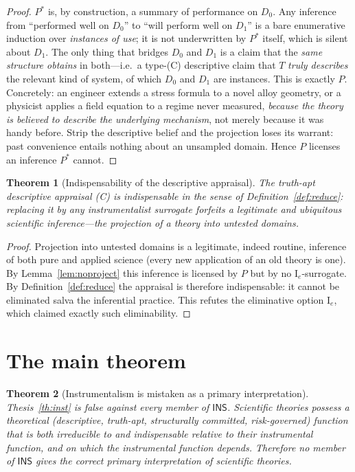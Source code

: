 \documentclass{amsart}
\theoremstyle{definition}
\theoremstyle{plain}
\newtheorem{theorem}{Theorem}
\begin{document}
\begin{proof}
$P^{*}$ is, by construction, a summary of performance on $D_0$. Any inference
from ``performed well on $D_0$'' to ``will perform well on $D_1$'' is a bare
enumerative induction over \emph{instances of use}; it is not underwritten by
$P^{*}$ itself, which is silent about $D_1$. The only thing that bridges $D_0$
and $D_1$ is a claim that the \emph{same structure obtains} in both---i.e.\ a
type-(C) descriptive claim that $T$ \emph{truly describes} the relevant kind of
system, of which $D_0$ and $D_1$ are instances. This is exactly $P$. Concretely:
an engineer extends a stress formula to a novel alloy geometry, or a physicist
applies a field equation to a regime never measured, \emph{because the theory is
believed to describe the underlying mechanism}, not merely because it was handy
before. Strip the descriptive belief and the projection loses its warrant: past
convenience entails nothing about an unsampled domain. Hence $P$ licenses an
inference $P^{*}$ cannot.
\end{proof}

\begin{theorem}[Indispensability of the descriptive appraisal]\label{thm:indispensable}
The truth-apt descriptive appraisal (C) is \emph{indispensable} in the sense of
Definition~\ref{def:reduce}: replacing it by any instrumentalist surrogate
forfeits a legitimate and ubiquitous scientific inference---the projection of a
theory into untested domains.
\end{theorem}

\begin{proof}
Projection into untested domains is a legitimate, indeed routine, inference of
both pure and applied science (every new application of an old theory is one).
By Lemma~\ref{lem:noproject} this inference is licensed by $P$ but by no
$\mathrm I_e$-surrogate. By Definition~\ref{def:reduce} the appraisal is
therefore indispensable: it cannot be eliminated salva the inferential
practice. This refutes the eliminative option $\mathrm I_e$, which claimed
exactly such eliminability.
\end{proof}

\section{The main theorem}

\begin{theorem}[Instrumentalism is mistaken as a primary
interpretation]\label{thm:main}
Thesis~\textup{\ref{th:inst}} is false against every member of $\mathsf{INS}$.
Scientific theories possess a theoretical (descriptive, truth-apt, structurally
committed, risk-governed) function that is both \emph{irreducible} to and
\emph{indispensable} relative to their instrumental function, and on which the
instrumental function depends. Therefore no member of $\mathsf{INS}$ gives the
correct primary interpretation of scientific theories.
\end{theorem}
\end{document}
